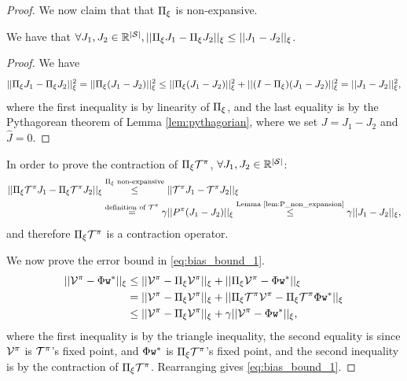 \begin{proof}
We now claim that that $\Pi_\xi$ is non-expansive.
\begin{lemma}
We have that $\forall {J}_1,{J}_2\in \mathbb{R}^{|\mathcal{S}|}, ||\Pi_\xi {J}_1 - \Pi_\xi {J}_2||_\xi \le ||{J}_1-{J}_2||_\xi$.
\end{lemma}

\begin{proof}
We have
$$||\Pi_\xi {J}_1 - \Pi_\xi {J}_2||_\xi^2 = ||\Pi_\xi({J}_1-{J}_2)||_\xi^2 \le ||\Pi_\xi({J}_1-{J}_2)||_\xi^2 + ||(I-\Pi_\xi)({J}_1-{J}_2)||_\xi^2 = ||{J}_1-{J}_2||_\xi^2,$$
where the first inequality is by linearity of $\Pi_\xi$, and the last equality is by the Pythagorean theorem of Lemma \ref{lem:pythagorian}, where we set $J={J}_1-{J}_2$ and $\widehat{J} = 0$.
\end{proof}

In order to prove the contraction of $\Pi_\xi \mathcal{T}^\pi$, $\forall {J}_1,{J}_2\in \mathbb{R}^{|\mathcal{S}|}$:
\begin{equation*}
\begin{split}
||\Pi_\xi \mathcal{T}^\pi {J}_1 - \Pi_\xi \mathcal{T}^\pi {J}_2||_\xi &\overset{\Pi_\xi \textrm{ non-expansive}}{\le} ||\mathcal{T}^\pi {J}_1 - \mathcal{T}^\pi {J}_2||_\xi\\
&\overset{\textrm{definition of } \mathcal{T}^\pi}{=} \gamma||P^\pi({J}_1-{J}_2)||_\xi \overset{\textrm{Lemma \ref{lem:P_non_expansion}}}{\le} \gamma||{J}_1-{J}_2||_\xi ,
\end{split}
\end{equation*}
and therefore $\Pi_\xi \mathcal{T}^\pi$ is a contraction operator.

We now prove the error bound in \eqref{eq:bias_bound_1}.
\begin{equation*}
\begin{split}
  ||\mathcal{V}^\pi - \Phi {\tt w}^*||_\xi  &\leq ||\mathcal{V}^\pi
-\Pi_\xi \mathcal{V}^\pi||_\xi + ||\Pi_\xi \mathcal{V}^\pi -\Phi {\tt w}^*||_\xi  \\
    &= ||\mathcal{V}^\pi -\Pi_\xi \mathcal{V}^\pi||_\xi + ||\Pi_\xi \mathcal{T}^\pi \mathcal{V}^\pi -\Pi_\xi \mathcal{T}^\pi\Phi {\tt w}^*||_\xi \\
&\leq ||\mathcal{V}^\pi -\Pi_\xi \mathcal{V}^\pi||_\xi + \gamma||\mathcal{V}^\pi-\Phi {\tt w}^*||_\xi,
\end{split}
\end{equation*}
where the first inequality is by the triangle inequality, the second equality is since $\mathcal{V}^\pi$ is $\mathcal{T}^\pi$'s fixed point, and $\Phi {\tt w}^*$ is $\Pi_\xi \mathcal{T}^\pi$'s fixed point, and the second inequality is by the contraction of $\Pi_\xi \mathcal{T}^\pi$. Rearranging gives \eqref{eq:bias_bound_1}.


\end{proof}
